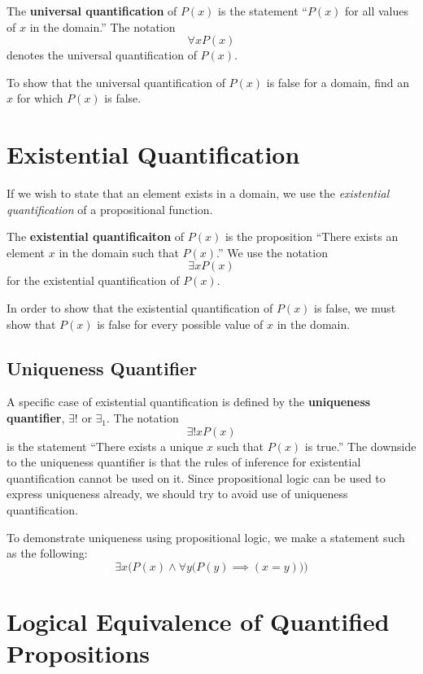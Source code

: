 The \textbf{universal quantification} of $P(x)$ is the statement
``$P(x)$ for all values of $x$ in the domain.''
The notation
\begin{equation}
  \forall x P(x)
\end{equation}
denotes the universal quantification of $P(x)$.

To show that the universal quantification of $P(x)$ is false for a domain, find an $x$ for which $P(x)$ is false.

\section{Existential Quantification}

If we wish to state that an element exists in a domain, we use the \emph{existential quantification} of a propositional function.

The \textbf{existential quantificaiton} of $P(x)$ is the proposition
  ``There exists an element $x$ in the domain such that $P(x)$.''
We use the notation \[\exists x P(x)\] for the existential quantification of $P(x)$.

\begin{note}
  In order to show that the existential quantification of $P(x)$ is false, we must
  show that $P(x)$ is false for every possible value of $x$ in the domain.
\end{note}


\subsection{Uniqueness Quantifier}
A specific case of existential quantification is defined by the
\textbf{uniqueness quantifier}, $\exists!$ or $\exists_1$. The notation
\[ \exists! x P(x) \]
is the statement ``There exists a unique $x$ such that $P(x)$ is true.'' The
downside to the uniqueness quantifier is that the rules of inference for
existential quantification cannot be used on it. Since propositional logic can
be used to express uniqueness already, we should try to avoid use of uniqueness
quantification.

To demonstrate uniqueness using propositional logic, we make a statement such as the following:
\[ \exists x \Big( P(x) \land \forall y \big( P(y) \implies (x=y)\big)\Big) \]

\section{Logical Equivalence of Quantified Propositions}

